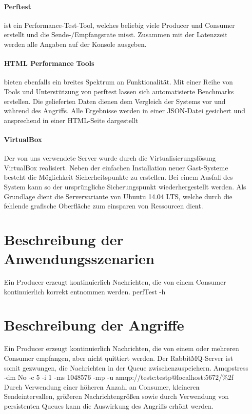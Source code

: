 \documentclass[	a4paper,
			11pt,
			titlepage,
			oneside,
			fleqn,
			listof=totoc,
			parskip,
			chapterprefix=false,
			numbers=noenddot]{scrreprt}
\begin{document}
\paragraph{Perftest} ist ein Performance-Test-Tool, welches beliebig viele Producer und Consumer erstellt und die Sende-/Empfangsrate misst. Zusammen mit der Latenzzeit werden alle Angaben auf der Konsole ausgeben.

\paragraph{HTML Performance Tools} bieten ebenfalls ein breites Spektrum an Funktionalität. Mit einer Reihe von Tools und Unterstützung von perftest lassen sich automatisierte Benchmarks erstellen. Die gelieferten Daten dienen dem Vergleich der Systems vor und während des Angriffs. Alle Ergebnisse werden in einer JSON-Datei gesichert und ansprechend in einer HTML-Seite dargestellt

\paragraph{VirtualBox} Der von uns verwendete Server wurde durch die Virtualisierungslösung VirtualBox realisiert. Neben der einfachen Installation neuer Gast-Systeme besteht die Möglichkeit Sicherheitspunkte zu erstellen. Bei einem Ausfall des System kann so der ursprüngliche Sicherungspunkt wiederhergestellt werden. Als Grundlage dient die Servervariante von Ubuntu 14.04 LTS, welche durch die fehlende grafische Oberfläche zum einsparen von Ressourcen dient.

	
	\clearpage
	\section*{Beschreibung der Anwendungsszenarien}
		{Ein Producer erzeugt kontinuierlich Nachrichten, die von einem Consumer kontinuierlich korrekt entnommen werden.}%
		{perfTest -h}%
		{}
		
	\usecase{}%
		{}%
		{}%
		{}
		
	\usecase{}%
		{}%
		{}%
		{}
	
	\clearpage
	\section*{Beschreibung der Angriffe}
		{Ein Producer erzeugt kontinuierlich Nachrichten, die von einem oder mehreren Consumer empfangen, aber nicht quittiert werden.%
		 Der RabbitMQ-Server ist somit gezwungen, die Nachrichten in der Queue zwischenzuspeichern.}%
		{}%
		{Amqpstress -dm No -c 5 -i 1 -ms 1048576 -mp -u amqp://testc:testp@localhost:5672/\%2f}%
		{}%
		{Durch Verwendung einer höheren Anzahl an Consumer, kleineren Sendeintervallen, größeren Nachrichtengrößen sowie durch Verwendung von persistenten %
		Queues kann die Auswirkung des Angriffs erhöht werden.}
	
\end{document}

